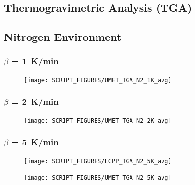 \documentclass{book}
\begin{document}
\begin{landscape}
\chapter{Thermogravimetric Analysis (TGA)}
\section{Nitrogen Environment}
\label{TGA_N2}
\subsection{$\beta$ = 1~K/min}
\begin{minipage}{0.65\textwidth}
\begin{figure}[H]
{\texttt{[image: SCRIPT\_FIGURES/UMET\_TGA\_N2\_1K\_avg]}}\\
\end{figure}
\end{minipage}
\vfill
\newpage
\subsection{$\beta$ = 2~K/min}
\begin{minipage}{0.65\textwidth}
\begin{figure}[H]
{\texttt{[image: SCRIPT\_FIGURES/UMET\_TGA\_N2\_2K\_avg]}}\\
\end{figure}
\end{minipage} 

\newpage
\subsection{$\beta$ = 5~K/min}
\begin{minipage}{0.65\textwidth}
\begin{figure}[H]
{\texttt{[image: SCRIPT\_FIGURES/LCPP\_TGA\_N2\_5K\_avg]}}\\
\end{figure}
\end{minipage} 
\begin{minipage}{0.35\textwidth}
\begin{figure}[H]
{\texttt{[image: SCRIPT\_FIGURES/UMET\_TGA\_N2\_5K\_avg]}}\\
\end{figure}
\end{minipage}

\newpage

\end{landscape}
\end{document}
